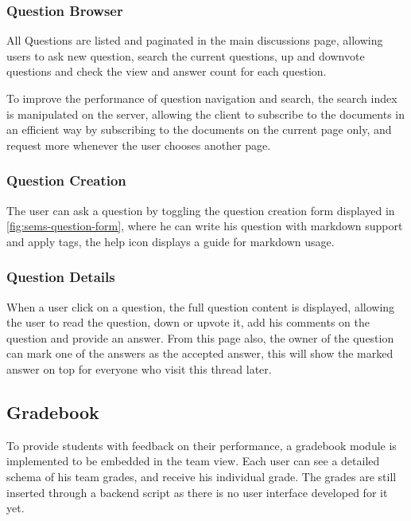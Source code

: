 \subsubsection{Question Browser}
\label{subs:question-browser}
All Questions are listed and paginated in the main discussions page, allowing users to ask new question, search the current questions, up and
downvote questions and check the view and answer count for each question.

\newParagraph
To improve the performance of question navigation and search, the search index is manipulated on the server, allowing the client to subscribe to
the documents in an efficient way by subscribing to the documents on the current page only, and request more whenever the user chooses another page.

\subsubsection{Question Creation}
\label{subs:question-creation}
The user can ask a question by toggling the question creation form displayed in \ref{fig:sems-question-form}, where he can
write his question with markdown support and apply tags, the help icon displays a guide for markdown usage.

\subsubsection{Question Details}
\label{subs:question-details}
When a user click on a question, the full question content is displayed, allowing the user to read the question, down or upvote it, add his comments
on the question and provide an answer. From this page also, the owner of the question can mark one of the answers as the accepted answer, this
will show the marked answer on top for everyone who visit this thread later.


\subsection{Gradebook}
\label{sub:gradebook}
To provide students with feedback on their performance, a gradebook module is implemented to be embedded in the team view. Each
user can see a detailed schema of his team grades, and receive his individual grade. The grades are still inserted through a backend
script as there is no user interface developed for it yet.

